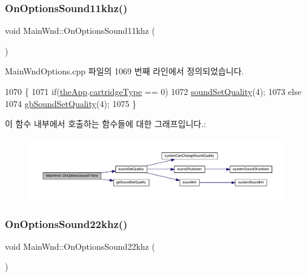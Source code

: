 \subsubsection{\texorpdfstring{On\+Options\+Sound11khz()}{OnOptionsSound11khz()}}
{\footnotesize\ttfamily void Main\+Wnd\+::\+On\+Options\+Sound11khz (\begin{DoxyParamCaption}{ }\end{DoxyParamCaption})\hspace{0.3cm}{\ttfamily [protected]}}



Main\+Wnd\+Options.\+cpp 파일의 1069 번째 라인에서 정의되었습니다.


\begin{DoxyCode}
1070 \{
1071   \textcolor{keywordflow}{if}(\mbox{\hyperlink{_v_b_a_8cpp_a8095a9d06b37a7efe3723f3218ad8fb3}{theApp}}.\mbox{\hyperlink{class_v_b_a_af300759fcbc7eeb00ce73f956fc5ddb7}{cartridgeType}} == 0)
1072     \mbox{\hyperlink{_sound_8cpp_a46bef5048521e8000f3850e686e7eb22}{soundSetQuality}}(4);
1073   \textcolor{keywordflow}{else}
1074     \mbox{\hyperlink{_g_b_8h_a86ed9a5e6bb5230a501d753280690618}{gbSoundSetQuality}}(4);
1075 \}
\end{DoxyCode}
이 함수 내부에서 호출하는 함수들에 대한 그래프입니다.\+:
\nopagebreak
\begin{figure}[H]
\begin{center}
\leavevmode
\includegraphics[width=350pt]{class_main_wnd_a8e81270ba800c278c27501dcf4ac7cf0_cgraph}
\end{center}
\end{figure}
\mbox{\label{class_main_wnd_af0c7e1b51b3b500531bbef87b56b5fe7}} 
\subsubsection{\texorpdfstring{On\+Options\+Sound22khz()}{OnOptionsSound22khz()}}
{\footnotesize\ttfamily void Main\+Wnd\+::\+On\+Options\+Sound22khz (\begin{DoxyParamCaption}{ }\end{DoxyParamCaption})\hspace{0.3cm}{\ttfamily [protected]}}



